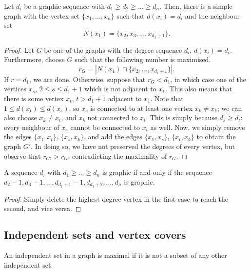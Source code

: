 \documentclass[11pt]{article}
\theoremstyle{definition}
\theoremstyle{remark}
\numberwithin{equation}{section}
\begin{document}
    \begin{theorem}
        Let $d_i$ be a graphic sequence with $d_1 \geq d_2 \geq \dots \geq d_n$.
        Then, there is a simple graph with the vertex set $\{x_1, \dots, x_n\}$ such
        that $d(x_i) = d_i$ and the neighbour set \[
            N(x_1) = \{x_2, x_3, \dots, x_{d_1 + 1}\}.
        \] 
    \end{theorem}
    \begin{proof}
        Let $G$ be one of the graphs with the degree sequence $d_i$, $d(x_i) = d_i$.
        Furthermore, choose $G$ such that the following number is maximised. \[
            r_G =  |N(x_1) \cap \{x_2, \dots, x_{d_1 + 1}\}|.
        \] If $r = d_1$, we are done. Otherwise, suppose that $r_G < d_1$, in which
        case one of the vertices $x_s$, $2 \leq s \leq d_1 + 1$ which is not adjacent
        to $x_1$. This also means that there is some vertex $x_t$, $t > d_1 + 1$
        adjacent to $x_1$. Note that $1 \leq d(x_t) \leq d(x_s)$, so $x_s$ is
        connected to at least one vertex $x_k \neq x_1$; we can also choose $x_k \neq
        x_t$, and $x_k$ not connected to $x_t$. This is simply because $d_s \geq
        d_t$: every neighbour of $x_s$ cannot be connected to $x_t$ as well. Now, we
        simply remove the edges $\{x_1, x_t\}$, $\{x_s, x_k\}$, and add the edges
        $\{x_1, x_s\}$, $\{x_t, x_k\}$ to obtain the graph $G'$. In doing so, we have
        not preserved the degrees of every vertex, but observe that $r_{G'} > r_{G}$,
        contradicting the maximality of $r_G$.
    \end{proof}

    \begin{corollary}
        A sequence $d_i$ with $d_1 \geq \dots \geq d_n$ is graphic if and only if the
        sequence $d_2 - 1, d_3 - 1, \dots, d_{d_1 + 1} - 1, d_{d_1 + 2}, \dots, d_n$
        is graphic.
    \end{corollary}
    \begin{proof}
        Simply delete the highest degree vertex in the first case to reach the
        second, and vice versa.
    \end{proof}

    \subsection{Independent sets and vertex covers}

    \begin{definition}
        An independent set in a graph is maximal if it is not a subset of any other
        independent set.
    \end{definition}
\end{document}
